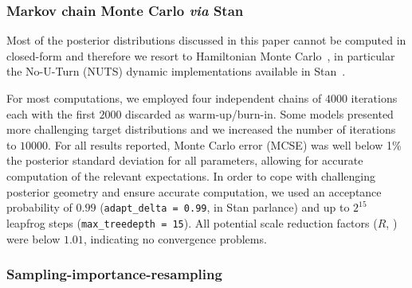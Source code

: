 \documentclass[a4paper, notitlepage, 10pt]{article}
\begin{document}
\subsubsection{Markov chain Monte Carlo \textit{via} Stan}
\label{sec:computation_mcmc}

Most of the posterior distributions discussed in this paper cannot be computed in closed-form and therefore we resort to Hamiltonian Monte Carlo~\citep{Neal2011}, in particular the No-U-Turn (NUTS) dynamic implementations available in Stan~\citep{Hoffman2014,Betancourt2017}.

For most computations, we employed four independent chains of $4000$ iterations each with the first $2000$ discarded as warm-up/burn-in.
Some models presented more challenging target distributions and we increased the number of iterations to $10 000$.
For all results reported, Monte Carlo error (MCSE) was well below 1\% the posterior standard deviation for all parameters, allowing for accurate computation of the relevant expectations.
In order to cope with challenging posterior geometry and ensure accurate computation, we used an acceptance probability of $0.99$ (\verb|adapt_delta = 0.99|, in Stan parlance) and up to $2^{15}$ leapfrog steps (\verb|max_treedepth = 15|).
All potential scale reduction factors ($\hat{R}$, \cite{Gelman1992}) were below $1.01$, indicating no convergence problems.

\subsubsection{Sampling-importance-resampling}
\label{sec:spIR}
\end{document}
